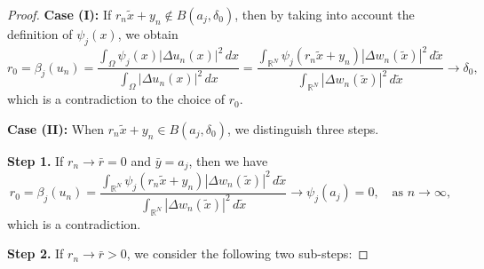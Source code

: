 \documentclass[10pt,a4paper]{amsart}
\numberwithin{equation}{section}
\begin{document}
\begin{proof}
\noindent\textbf{Case (I):} 
If \( r_n\tilde{x}+y_n \notin B(a_j, \delta_0)\), then by taking into account the 
definition of \(\psi_j(x)\), we obtain
\[
 r_0=\beta_j(u_n)=\frac{\int_{\Omega} \psi_{j}(x)|\Delta u_n(x)|^2\,dx}
 {\int_{\Omega} |\Delta u_n(x)|^2\,dx}
 =\frac{\int_{\mathbb{R}^N} \psi_{j}(r_n\tilde{x}+y_n)|\Delta w_n(\tilde{x})|^2
 \,d\tilde{x}}{\int_{\mathbb{R}^N} |\Delta w_n(\tilde{x})|^2\,d\tilde{x}} \to \delta_0,
\]
which is a contradiction to the choice of \(r_0\).
\smallskip

\noindent \textbf{Case (II):} When \(r_n\tilde{x}+y_n \in B(a_j, \delta_0)\), we 
distinguish three steps.
\smallskip

\noindent\textbf{Step 1.} If \(r_n\to \bar{r}=0\) and \(\bar {y}=a_j\), then we have
 \[
 r_0=\beta_j(u_n)=\frac{\int_{\mathbb{R}^N} \psi_{j}(r_n\tilde{x}+y_n)|\Delta
  w_n(\tilde{x})|^2\,d\tilde{x}}
 {\int_{\mathbb{R}^N} |\Delta w_n(\tilde{x})|^2\,d\tilde{x}} \to \psi_j(a_j)=0, 
 \quad\text{as } n\to \infty,
 \]
which is a contradiction.
\smallskip

\noindent\textbf{Step 2.} If \(r_n\to \bar{r}>0\), we consider the following two 
sub-steps:
\smallskip


\end{proof}
\end{document}
